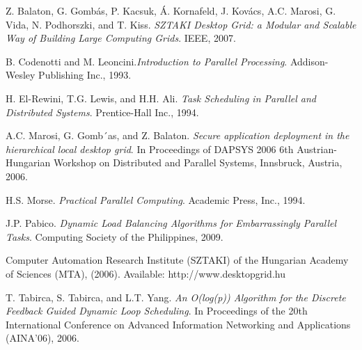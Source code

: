 \documentclass[10pt, twocolumn, letterpaper]{article}
\begin{document}
\begin{thebibliography}{8}
\begin{flushleft}Z. Balaton, G. Gomb\'as, P. Kacsuk, \'A. Kornafeld, J. Kovács, A.C. Marosi, G. Vida, N. Podhorszki, and T. Kiss. \emph{SZTAKI Desktop Grid: a Modular and Scalable Way of Building Large Computing Grids}. IEEE, 2007.
\end{flushleft}

\begin{flushleft}B. Codenotti and M. Leoncini.\emph{Introduction to Parallel Processing}. Addison-Wesley Publishing Inc., 1993.
\end{flushleft}

\begin{flushleft}H. El-Rewini, T.G. Lewis, and H.H. Ali. \emph{Task  Scheduling in Parallel and Distributed Systems}. Prentice-Hall Inc., 1994.
\end{flushleft}

\begin{flushleft}A.C. Marosi, G. Gomb´as, and Z. Balaton. \emph{Secure application deployment in the hierarchical local desktop grid}. In Proceedings of DAPSYS 2006 6th Austrian-Hungarian Workshop on Distributed and Parallel Systems, Innsbruck, Austria, 2006.
\end{flushleft}

\begin{flushleft}H.S. Morse. \emph{Practical Parallel Computing}. Academic Press, Inc., 1994.
\end{flushleft}

\begin{flushleft}J.P. Pabico. \emph{Dynamic Load Balancing Algorithms for Embarrassingly Parallel Tasks}. Computing Society of the Philippines, 2009.
\end{flushleft}

\begin{flushleft}Computer Automation Research Institute (SZTAKI) of the Hungarian Academy of Sciences (MTA), (2006). Available: http://www.desktopgrid.hu
\end{flushleft}

\begin{flushleft}T. Tabirca, S. Tabirca, and L.T. Yang. \emph{An O(log(p)) Algorithm for the Discrete Feedback Guided Dynamic Loop Scheduling}. In Proceedings of the 20th International Conference on Advanced Information Networking and Applications (AINA’06), 2006.
\end{flushleft}

\end{thebibliography}
\end{document}
